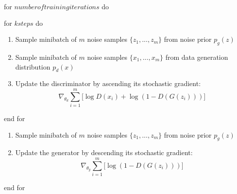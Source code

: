 \hrulefill


\begin{description} \item
for \( number of training iterations \) do

  \begin{description}
  \item for \( k steps \) do

    \begin{enumerate}

    \item Sample minibatch of \( m \) noise samples \( \{z_1, ... ,z_m \} \) from noise prior \( p_g(z) \)
    \item Sample minibatch of \( m \) noise samples \( \{x_1, ... ,x_m \} \) from data generation distribution \( p_d(x) \)
    \item Update the discriminator by ascending its stochastic gradient:
    \[
      \nabla_{\theta_d} \sum_{i=1}^m \big[\log D(x_i) + \log ( 1 - D(G(z_i)) ) \big]
    \]

    \end{enumerate}

  \item end for
  \end{description}

  \begin{enumerate}

    \item Sample minibatch of \( m \) noise samples \( \{z_1, ... ,z_m \} \) from noise prior \( p_g(z) \)
    \item Update the generator by descending its stochastic gradient:
    \[
      \nabla_{\theta_g} \sum_{i=1}^m \big[\log ( 1 - D(G(z_i)) ) \big]
    \]

  \end{enumerate}

\item end for
\end{description}

\hrulefill
